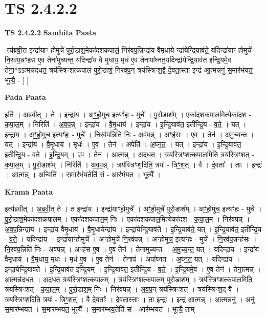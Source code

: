 \documentclass[17pt]{extarticle}
\begin{document}
\section{ TS 2.4.2.2 }

\textbf{TS 2.4.2.2 } \newline
\textbf{Samhita Paata} \newline

-त्य॑ब्रवी॒त्त इन्द्रा॑याꣳ हो॒मुचे॑ पुरो॒डाश॒मेका॑दशकपालं॒ निर॑वप॒न्निन्द्रा॑य वैमृ॒धाये-न्द्रा॑येन्द्रि॒याव॑ते॒ यदिन्द्रा॑याꣳ हो॒मुचे॑ नि॒रव॑प॒न्नꣳह॑स ए॒व तेना॑मुच्यन्त॒ यदिन्द्रा॑य वै मृ॒धाय॒ मृध॑ ए॒व तेनापा᳚घ्नत॒यदिन्द्रा॑येन्द्रि॒याव॑त इन्द्रि॒यमे॒व तेना॒*ऽऽत्मन्न॑दधत॒ त्रय॑स्त्रिꣳशत्कपालं पुरो॒डाशं॒ निर॑वप॒न् त्रय॑स्त्रिꣳश॒द्वै दे॒वता॒स्ता इन्द्र॑ आ॒त्मन्ननु॑ स॒मार॑भंयत॒ भूत्यै॒ - [  ] \newline

\textbf{Pada Paata} \newline

इति॑ । अ॒ब्र॒वी॒त् । ते । इन्द्रा॑य । अꣳ॒॒हो॒मुच॒ इत्यꣳ॑हः - मुचे᳚ । पु॒रो॒डाश᳚म् । एका॑दशकपाल॒मित्येका॑दश - क॒पा॒ल॒म् । निरिति॑ । अ॒व॒प॒न्न् । इन्द्रा॑य । वै॒मृ॒धाय॑ । इन्द्रा॑य । इ॒न्द्रि॒याव॑त॒ इती᳚न्द्रि॒य - व॒ते॒ । यत् । इन्द्रा॑य । अꣳ॒॒हो॒मुच॒ इत्यꣳ॑हः - मुचे᳚ । नि॒रव॑प॒न्निति॑ निः - अव॑पन्न् । अꣳह॑सः । ए॒व । तेन॑ । अ॒मु॒च्य॒न्त॒ । यत् । इन्द्रा॑य । वै॒मृ॒धाय॑ । मृधः॑ । ए॒व । तेन॑ । अपेति॑ । अ॒घ्न॒त॒ । यत् । इन्द्रा॑य । इ॒न्द्रि॒याव॑त॒ इती᳚न्द्रि॒य - व॒ते॒ । इ॒न्द्रि॒यम् । ए॒व । तेन॑ । आ॒त्मन्न् । अ॒द॒ध॒त॒ । त्रय॑स्त्रिꣳशत्कपाल॒मिति॒ त्रय॑स्त्रिꣳशत् - क॒पा॒ल॒म् । पु॒रो॒डाश᳚म् । निरिति॑ । अ॒व॒प॒न्न् । त्रय॑स्त्रिꣳश॒दिति॒ त्रयः॑ - त्रिꣳ॒॒श॒त् । वै । दे॒वताः᳚ । ताः । इन्द्रः॑ । आ॒त्मन्न् । अन्विति॑ । स॒मार॑भंय॒तेति॑ सं - आर॑भंयत । भूत्यै᳚ ।  \newline


\textbf{Krama Paata} \newline

इत्य॑ब्रवीत् । अ॒ब्र॒वी॒त् ते । त इन्द्रा॑य । इन्द्रा॑याꣳहो॒मुचे᳚ । अꣳ॒॒हो॒मुचे॑ पुरो॒डाश᳚म् । अꣳ॒॒हो॒मुच॒ इत्यꣳ॑हः - मुचे᳚ । पु॒रो॒डाश॒मेका॑दशकपालम् । एका॑दशकपाल॒म् निः । एका॑दशकपाल॒मित्येका॑दश - क॒पा॒ल॒म् । निर॑वपन्न् । अ॒व॒प॒न्निन्द्रा॑य । इन्द्रा॑य वैमृ॒धाय॑ । वै॒मृ॒धायेन्द्रा॑य । इन्द्रा॑येन्द्रि॒याव॑ते । इ॒न्द्रि॒याव॑ते॒ यत् । इ॒न्द्रि॒याव॑त॒ इती᳚न्द्रि॒य - व॒ते॒ । यदिन्द्रा॑य । इन्द्रा॑याꣳहो॒मुचे᳚ । अꣳ॒॒हो॒मुचे॑ नि॒रव॑पन्न् । अꣳ॒॒हो॒मुच॒ इत्यꣳ॑हः - मुचे᳚ । नि॒रव॑प॒न्नꣳह॑सः । नि॒रव॑प॒न्निति॑ निः - अव॑पन्न् । अꣳह॑स ए॒व । ए॒व तेन॑ । तेना॑मुच्यन्त । अ॒मु॒च्य॒न्त॒ यत् । यदिन्द्रा॑य । इन्द्रा॑य वैमृ॒धाय॑ । वै॒मृ॒धाय॒ मृधः॑ । मृध॑ ए॒व । ए॒व तेन॑ । तेनाप॑ । अपा᳚घ्नत । अ॒घ्न॒त॒ यत् । यदिन्द्रा॑य । इन्द्रा॑येन्द्रि॒याव॑ते । इ॒न्द्रि॒याव॑त इन्द्रि॒यम् । इ॒न्द्रि॒याव॑त॒ इती᳚न्द्रि॒य - व॒ते॒ । इ॒न्द्रि॒यमे॒व । ए॒व तेन॑ । तेना॒त्मन्न् । आ॒त्मन्न॑दधत । अ॒द॒ध॒त॒ त्रय॑स्त्रिꣳशत्कपालम् । त्रय॑स्त्रिꣳशत्कपालम् पुरो॒डाश᳚म् । त्रय॑स्त्रिꣳशत्कपाल॒मिति॒ त्रय॑स्त्रिꣳशत् - क॒पा॒ल॒म् । पु॒रो॒डाश॒म् निः । निर॑वपन्न् । अ॒व॒प॒न् त्रय॑स्त्रिꣳशत् । त्रय॑स्त्रिꣳश॒द् वै । त्रय॑स्त्रिꣳश॒दिति॒ त्रयः॑ - त्रिꣳ॒॒श॒त्॒ । वै दे॒वताः᳚ । दे॒वता॒स्ताः । ता इन्द्रः॑ । इन्द्र॑ आ॒त्मन्न् । आ॒त्मन्ननु॑ । अनु॑ स॒मार॑म्भयत । स॒मार॑म्भयत॒ भूत्यै᳚ । स॒मार॑म्भय॒तेति॑ सं - आर॑म्भयत । भूत्यै॒ ताम् \newline
\end{document}
